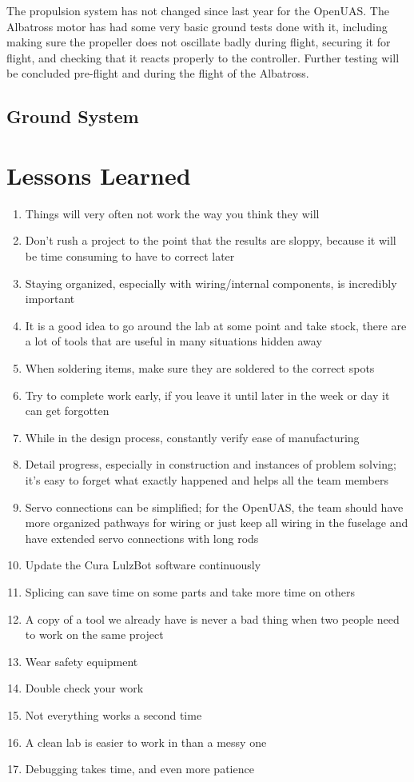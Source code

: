 \documentclass{article}
\begin{document}
The propulsion system has not changed since last year for the OpenUAS. The Albatross motor has had some very basic ground tests done with it, including making sure the propeller does not oscillate badly during flight, securing it for flight, and checking that it reacts properly to the controller. Further testing will be concluded pre-flight and during the flight of the Albatross.

\subsection{Ground System}

\section{Lessons Learned}

\begin{enumerate}
\item Things will very often not work the way you think they will
\item Don't rush a project to the point that the results are sloppy, because it will be time consuming to have to correct later
\item Staying organized, especially with wiring/internal components, is incredibly important
\item It is a good idea to go around the lab at some point and take stock, there are a lot of tools that are useful in many situations hidden away
\item When soldering items, make sure they are soldered to the correct spots
\item Try to complete work early, if you leave it until later in the week or day it can get forgotten
\item While in the design process, constantly verify ease of manufacturing
\item Detail progress, especially in construction and instances of problem solving; it's easy to forget what exactly happened and helps all the team members
\item Servo connections can be simplified; for the OpenUAS, the team should have more organized pathways for wiring or just keep all wiring in the fuselage and have extended servo connections with long rods
\item Update the Cura LulzBot software continuously
\item Splicing can save time on some parts and take more time on others
\item A copy of a tool we already have is never a bad thing when two people need to work on the same project
\item Wear safety equipment 
\item Double check your work
\item Not everything works a second time
\item A clean lab is easier to work in than a messy one
\item Debugging takes time, and even more patience 

\end{enumerate}
\end{document}
